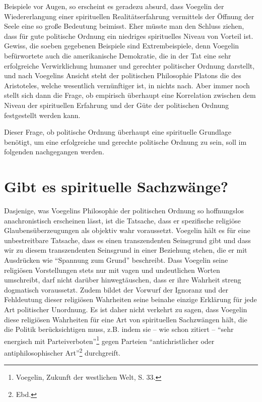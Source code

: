 Beispiele vor Augen, so erscheint es geradezu absurd, dass Voegelin der
Wiedererlangung einer spirituellen Realitätserfahrung vermittels der Öffnung
der Seele eine so große Bedeutung beimisst. Eher müsste man den Schluss ziehen,
dass für gute politische Ordnung ein niedriges spirituelles Niveau von Vorteil
ist. Gewiss, die soeben gegebenen Beispiele sind Extrembeispiele, denn
Voegelin befürwortete auch die amerikanische Demokratie, die in der Tat eine
sehr erfolgreiche Verwirklichung humaner und gerechter politischer Ordnung
darstellt, und nach Voegelins Ansicht steht der politischen Philosophie
Platons die des Aristoteles, welche wesentlich vernünftiger ist, in nichts
nach. Aber immer noch stellt sich dann die Frage, ob empirisch überhaupt eine
Korrelation zwischen dem Niveau der spirituellen Erfahrung und der Güte der
politischen Ordnung festgestellt werden kann.

Dieser Frage, ob politische Ordnung überhaupt eine spirituelle Grundlage
benötigt, um eine erfolgreiche und gerechte politische Ordnung zu sein, soll
im folgenden nachgegangen werden.

\section{Gibt es spirituelle Sachzwänge?}
\label{spirituelleSachzwänge}

Dasjenige, was Voegelins Philosophie der politischen Ordnung so hoffnungslos
anachronistisch erscheinen lässt, ist die Tatsache, dass er spezifische
religiöse Glaubensüberzeugungen als objektiv wahr voraussetzt. Voegelin hält
es für eine unbestreitbare Tatsache, dass es einen transzendenten Seinsgrund
gibt und dass wir zu diesem transzendenten Seinsgrund in einer Beziehung
stehen, die er mit Ausdrücken wie "`Spannung zum Grund"' beschreibt. Dass
Voegelin seine religiösen Vorstellungen stets nur mit vagen und undeutlichen
Worten umschreibt, darf nicht darüber hinwegtäuschen, dass er ihre Wahrheit
streng dogmatisch voraussetzt. Zudem bildet der Vorwurf der Ignoranz und der
Fehldeutung dieser religiösen Wahrheiten seine beinahe einzige Erklärung für
jede Art politischer Unordnung. Es ist daher nicht verkehrt zu sagen, dass
Voegelin diese religiösen Wahrheiten für eine Art von spirituellen Sachzwängen
hält, die die Politik berücksichtigen muss, z.B.  indem sie -- wie
schon zitiert -- "`sehr energisch mit Parteiverboten"'\footnote{Voegelin,
  Zukunft der westlichen Welt, S. 33.}  gegen Parteien "`antichristlicher oder
antiphilosophischer Art"'\footnote{Ebd.} durchgreift.

